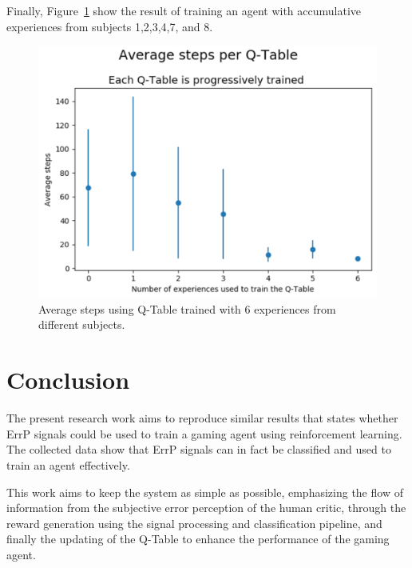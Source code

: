 \documentclass[journal]{IEEEtran}
\begin{document}
{{Finally, Figure~\ref{fig:avg_steps_all} show the result of training an agent with accumulative experiences from subjects 1,2,3,4,7, and 8.

\begin{figure}[h!]
\centering
\includegraphics[scale=0.4]{Images/Average_steps/all.png}
\caption{Average steps using Q-Table trained with 6 experiences from different subjects.}
\label{fig:avg_steps_all}
\end{figure}

\section{Conclusion}
\label{conclusions}


The present research work aims to reproduce similar results that states whether ErrP signals could be used to train a gaming agent using reinforcement learning. The collected data show that ErrP signals can in fact be classified and used to train an agent effectively. 

This work aims to keep the system as simple as possible, emphasizing the flow of information from the subjective error perception of the human critic, through the reward generation using the signal processing and classification pipeline, and finally the updating of the Q-Table to enhance the performance of the gaming agent.

}}
\end{document}
